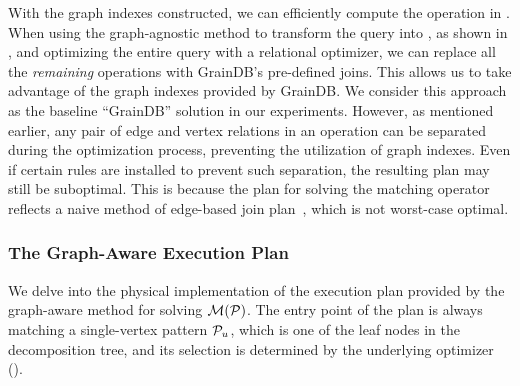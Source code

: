 
With the graph indexes constructed, we can efficiently compute the \EVjoin operation in .
When using the graph-agnostic method to transform the \spjm query into \spj, as shown in , and optimizing the entire \spj query with a relational optimizer, we can replace all the \emph{remaining} \EVjoin operations with GrainDB's pre-defined joins. This allows us to take advantage of the graph indexes provided by GrainDB. We consider this approach as the baseline ``GrainDB'' solution in our experiments.
However, as mentioned earlier, any pair of edge and vertex relations in an \EVjoin operation can be separated during the optimization process, preventing the utilization of graph indexes.
Even if certain rules are installed to prevent such separation, the resulting plan may still be suboptimal. This is because the plan for solving the matching operator reflects a naive method of edge-based join plan~\cite{lai2019distributed}, which is not worst-case optimal. 

\subsubsection{The Graph-Aware Execution Plan}
\label{sec:join-matching-operator}
We delve into the physical implementation of the execution plan provided by the graph-aware method for solving $\mathcal{M}(\mathcal{P})$. The entry point of the plan is always matching a single-vertex pattern $\mathcal{P}_u$, which is one of the leaf nodes in the decomposition tree, and its selection is determined by the underlying optimizer ().

